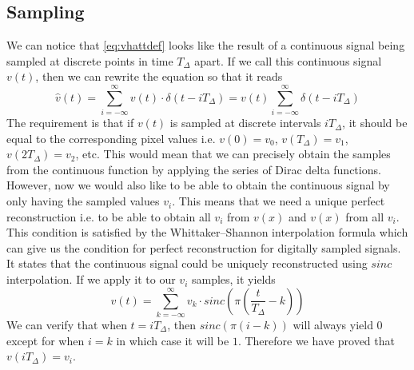 \documentclass[a4paper,12pt,twoside,openright]{report}
\begin{document}
\subsection{Sampling}
We can notice that \ref{eq:vhattdef} looks like the result of a continuous signal being sampled at discrete points in time $T_{\Delta}$ apart. If we call this continuous signal $v(t)$, then we can rewrite the equation so that it reads
\begin{equation}
\hat{v}(t) = \sum\limits_{i=-\infty}^{\infty} v(t) \cdot \delta(t-i T_{\Delta}) = v(t) \sum\limits_{i=-\infty}^{\infty} \delta(t-i T_{\Delta})
\end{equation}
The requirement is that if $v(t)$ is sampled at discrete intervals $i T_{\Delta}$, it should be equal to the corresponding pixel values i.e. $v(0)=v_{0}$, $v(T_{\Delta})=v_{1}$, $v(2 T_{\Delta})=v_{2}$, etc. This would mean that we can precisely obtain the samples from the continuous function by applying the series of Dirac delta functions. However, now we would also like to be able to obtain the continuous signal by only having the sampled values $v_{i}$. This means that we need a unique perfect reconstruction i.e. to be able to obtain all $v_{i}$ from $v(x)$ and $v(x)$ from all $v_{i}$. This condition is satisfied by the Whittaker--Shannon interpolation formula\cite{shannon1949communication} which can give us the condition for perfect reconstruction for digitally sampled signals. It states that the continuous signal could be uniquely reconstructed using $sinc$ interpolation. If we apply it to our $v_{i}$ samples, it yields
\begin{equation}
v(t) = \sum\limits_{k=-\infty}^{\infty} v_{k} \cdot sinc ( \pi \left( \frac{t}{T_{\Delta}} - k \right) )
\end{equation}
We can verify that when $t=i T_{\Delta}$, then $sinc(\pi (i-k) )$ will always yield $0$ except for when $i = k$ in which case it will be $1$. Therefore we have proved that $v(i T_{\Delta}) = v_{i}$.
\end{document}
